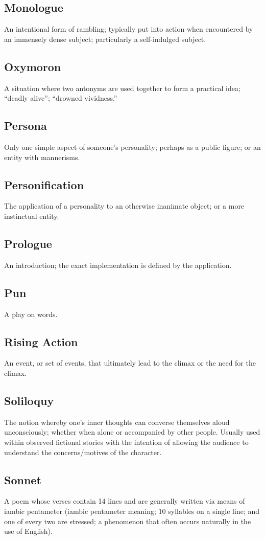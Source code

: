 \documentclass{article}
\begin{document}
\begin{addmargin}[0.5in]{0in}
    \subsection*{Monologue}
        An intentional form of rambling; typically put into action when encountered by an immensely dense subject;
        particularly a self-indulged subject.
    \subsection*{Oxymoron}
        A situation where two antonyms are used together to form a practical idea; ``deadly alive''; ``drowned vividness.''
    \subsection*{Persona}
        Only one simple aspect of someone's personality; perhaps as a public figure; or an entity with mannerisms.
    \subsection*{Personification}
        The application of a personality to an otherwise inanimate object; or a more instinctual entity.
    \subsection*{Prologue}
        An introduction; the exact implementation is defined by the application.
    \subsection*{Pun}
        A play on words.
    \subsection*{Rising Action}
        An event, or set of events, that ultimately lead to the climax or the need for the climax.
    \subsection*{Soliloquy}
        The notion whereby one's inner thoughts can converse themselves aloud unconsciously; whether when alone or 
        accompanied by other people. Usually used within observed fictional stories with the intention of allowing the
        audience to understand the concerns/motives of the character.
    \subsection*{Sonnet}
        A poem whose verses contain 14 lines and are generally written via means of iambic pentameter (iambic pentameter
        meaning; 10 syllables on a single line; and one of every two are stressed; a phenomenon that often occurs 
        naturally in the use of English).

\end{addmargin}
\end{document}
